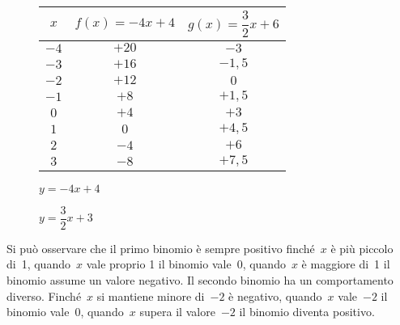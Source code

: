 \begin{inaccessibleblock}
 \begin{figure}[h]
 \begin{minipage}[]{.45\textwidth}
\begin{center}
 \begin{tabular}{c|c|c}
  \(x\) & \(f(x) = -4 x +4\) & \(g(x) = \dfrac{3}{2} x +6\) \\
  \hline
  \(-4\) & \(+20\) & \(-3\) \\
  \(-3\) & \(+16\) & \(-1,5\) \\
  \(-2\) & \(+12\) & \(0\) \\
  \(-1\) & \(+8\) & \(+1,5\) \\
  \( 0\) & \(+4\) & \(+3\) \\
  \( 1\) & \(0\) & \(+4,5\) \\
  \( 2\) & \(-4\) & \(+6\) \\
  \( 3\) & \(-8\) & \(+7,5\) %
 \end{tabular}
\end{center}
 \end{minipage}
 \hfill
 \begin{minipage}[]{.25\textwidth}
\begin{center} 
\disrettaa 
\vspace{3mm}
\(y = -4 x +4\)
\end{center}
 \end{minipage}
 \hfill
 \begin{minipage}[]{.25\textwidth}
\begin{center} 
\disrettab 
\(y = \dfrac{3}{2} x +3\)
\end{center}
 \end{minipage}
\end{figure}
\end{inaccessibleblock}

Si può osservare che il primo binomio è sempre positivo finché~\(x\) è più 
piccolo di~1, quando~\(x\) vale proprio 1 il binomio vale~0, quando~\(x\) è 
maggiore di~1 il binomio assume un valore negativo.
Il secondo binomio ha un comportamento diverso. Finché~\(x\) si mantiene 
minore di~\(-2\) è negativo, quando~\(x\) vale~\(-2\) il binomio vale~0, 
quando~\(x\) supera il valore~\(-2\) il binomio diventa positivo.

